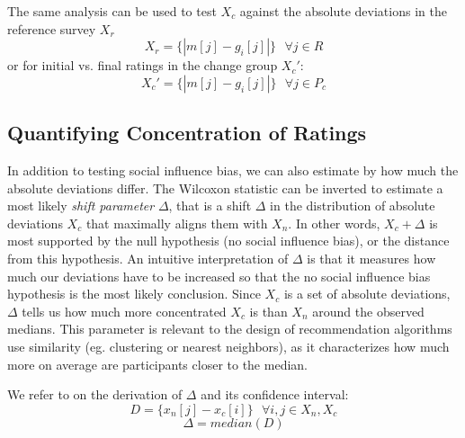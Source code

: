 The same analysis can be used to test $X_c$ against the absolute deviations in the reference survey $X_r$
\begin{equation}
X_r = \{|m[j] - g_i[j]|\}\text{ }\forall j \in R
\end{equation} 
or for initial vs. final ratings in the change group $X_c'$:
\begin{equation}
X_c' = \{|m[j] - g_i[j]|\}\text{ }\forall j \in P_c
\end{equation}
\subsection{Quantifying Concentration of Ratings}
In addition to testing social influence bias, we can also estimate by how much the absolute deviations differ. 
The Wilcoxon statistic can be inverted to estimate a most likely \emph{shift parameter} $\Delta$, that is a shift $\Delta$ in the distribution of absolute deviations $X_c$ that maximally aligns them with $X_n$.
In other words, $X_c + \Delta$ is most supported by the null hypothesis (no social influence bias), or the distance from this hypothesis.
An intuitive interpretation of $\Delta$ is that it measures how much our deviations have to be increased so that the no social influence bias hypothesis is the most likely conclusion.
Since $X_c$ is a set of absolute deviations, $\Delta$ tells us how much more concentrated $X_c$ is than $X_n$ around the observed medians.
This parameter is relevant to the design of recommendation algorithms use similarity (eg. clustering or nearest neighbors), as it characterizes how much more on average are participants closer to the median.

We refer to \cite{lehmann2006nonparametrics} on the derivation of $\Delta$ and its confidence interval:
\begin{equation}
D = \{x_n[j] - x_c[i]\} \text{ } \forall i,j \in X_n, X_c
\end{equation}
\begin{equation}
\Delta = median(D)
\end{equation}

